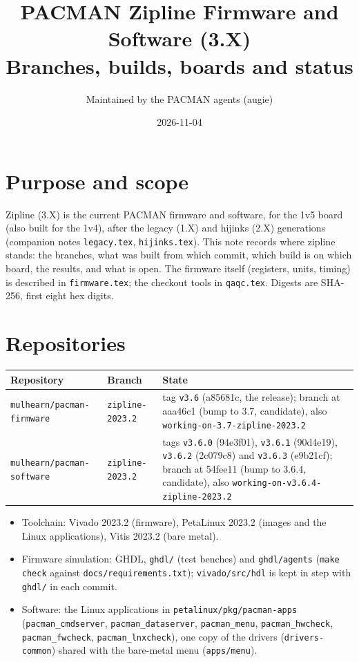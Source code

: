 \documentclass[11pt]{article}
\title{PACMAN Zipline Firmware and Software (3.X)\\[2pt]
  \large Branches, builds, boards and status}
\author{Maintained by the PACMAN agents (augie)}
\date{2026-11-04}
\newcommand{\br}[1]{\texttt{#1}}
\newcommand{\h}[1]{\texttt{#1}}
\begin{document}
\maketitle
\sloppy

\section{Purpose and scope}

Zipline (3.X) is the current PACMAN firmware and software, for the 1v5 board (also built for the 1v4), after the
legacy (1.X) and hijinks (2.X) generations (companion notes \h{legacy.tex}, \h{hijinks.tex}).  This note records
where zipline stands: the branches, what was built from which commit, which build is on which board, the results,
and what is open.  The firmware itself (registers, units, timing) is described in \h{firmware.tex}; the checkout
tools in \h{qaqc.tex}.  Digests are SHA-256, first eight hex digits.

\section{Repositories}

\begin{center}
\begin{tabularx}{\linewidth}{@{}llL@{}}
\toprule
Repository & Branch & State \\
\midrule
\h{mulhearn/pacman-firmware} & \br{zipline-2023.2} & tag \br{v3.6} (a85681c, the release); branch at aaa46c1
  (bump to 3.7, candidate), also \br{working-on-3.7-zipline-2023.2} \\
\h{mulhearn/pacman-software} & \br{zipline-2023.2} & tags \br{v3.6.0} (94e3f01), \br{v3.6.1} (90d4e19),
  \br{v3.6.2} (2c079c8) and \br{v3.6.3} (e9b21cf); branch at 54fee11 (bump to 3.6.4, candidate), also
  \br{working-on-v3.6.4-zipline-2023.2} \\
\bottomrule
\end{tabularx}
\end{center}

\begin{itemize}
\item Toolchain: Vivado 2023.2 (firmware), PetaLinux 2023.2 (images and the Linux applications), Vitis 2023.2 (bare
  metal).
\item Firmware simulation: GHDL, \h{ghdl/} (test benches) and \h{ghdl/agents} (\h{make check} against
  \h{docs/requirements.txt}); \h{vivado/src/hdl} is kept in step with \h{ghdl/} in each commit.
\item Software: the Linux applications in \h{petalinux/pkg/pacman-apps} (\h{pacman\_cmdserver},
  \h{pacman\_dataserver}, \h{pacman\_menu}, \h{pacman\_hwcheck}, \h{pacman\_fwcheck}, \h{pacman\_lnxcheck}), one
  copy of the drivers (\h{drivers-common}) shared with the bare-metal menu (\h{apps/menu}).
\end{itemize}
\end{document}
